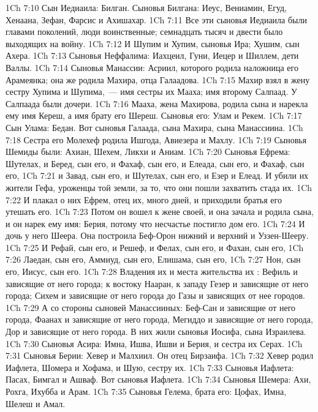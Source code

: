 \vs 1Ch 7:10 Сын Иедиаила: Билган. Сыновья Билгана: Иеус, Вениамин, Егуд, Хенаана, Зефан, Фарсис и Ахишахар.
\vs 1Ch 7:11 Все эти сыновья Иедиаила были главами поколений, люди воинственные; семнадцать тысяч и двести было выходящих на войну.
\vs 1Ch 7:12 И Шупим и Хупим, сыновья Ира; Хушим, сын Ахера.
\rsbpar\vs 1Ch 7:13 Сыновья Неффалима: Иахцеил, Гуни, Иецер и Шиллем, дети Валлы.
\rsbpar\vs 1Ch 7:14 Сыновья Манассии: Асриил, которого родила наложница его Арамеянка; она же родила Махира, отца Галаадова.
\vs 1Ch 7:15 Махир взял в жену сестру Хупима и Шупима,~--- имя сестры их Мааха; имя второму Салпаад. У Салпаада были  дочери.
\vs 1Ch 7:16 Мааха, жена Махирова, родила сына и нарекла ему имя Кереш, а имя брату его Шереш. Сыновья его: Улам и Рекем.
\vs 1Ch 7:17 Сын Улама: Бедан. Вот сыновья Галаада, сына Махира, сына Манассиина.
\vs 1Ch 7:18 Сестра его Молехеф родила Ишгода, Авиезера и Махлу.
\vs 1Ch 7:19 Сыновья Шемиды были: Ахиан, Шехем, Ликхи и Аниам.
\rsbpar\vs 1Ch 7:20 Сыновья Ефрема: Шутелах, и Беред, сын его, и Фахаф, сын его, и Елеада, сын его, и Фахаф, сын его,
\vs 1Ch 7:21 и Завад, сын его, и Шутелах, сын его, и Езер и Елеад. И убили их жители Гефа, уроженцы той земли, за то, что они пошли захватить стада их.
\vs 1Ch 7:22 И плакал о них Ефрем, отец их, много дней, и приходили братья его утешать его.
\vs 1Ch 7:23 Потом он вошел к жене своей, и она зачала и родила сына, и он нарек ему имя: Берия, потому что несчастье постигло дом его.
\vs 1Ch 7:24 И дочь у него  Шеера. Она построила Беф-Орон нижний и верхний и Уззен-Шееру.
\vs 1Ch 7:25 И Рефай, сын его, и Решеф, и Фелах, сын его, и Фахан, сын его,
\vs 1Ch 7:26 Лаедан, сын его, Аммиуд, сын его, Елишама, сын его,
\vs 1Ch 7:27 Нон, сын его, Иисус, сын его.
\vs 1Ch 7:28 Владения их и места жительства их : Вефиль и зависящие от него города; к востоку Нааран, к западу Гезер и зависящие от него города; Сихем и зависящие от него города до Газы и зависящих от нее городов.
\vs 1Ch 7:29 А со стороны сыновей Манассииных: Беф-Сан и зависящие от него города, Фаанах и зависящие от него города, Мегиддо и зависящие от него города, Дор и зависящие от него города. В них жили сыновья Иосифа, сына Израилева.
\rsbpar\vs 1Ch 7:30 Сыновья Асира: Имна, Ишва, Ишви и Берия, и сестра их Серах.
\vs 1Ch 7:31 Сыновья Берии: Хевер и Малхиил. Он отец Бирзаифа.
\vs 1Ch 7:32 Хевер родил Иафлета, Шомера и Хофама, и Шую, сестру их.
\vs 1Ch 7:33 Сыновья Иафлета: Пасах, Бимгал и Ашваф. Вот сыновья Иафлета.
\vs 1Ch 7:34 Сыновья Шемера: Ахи, Рохга, Ихубба и Арам.
\vs 1Ch 7:35 Сыновья Гелема, брата его: Цофах, Имна, Шелеш и Амал.
